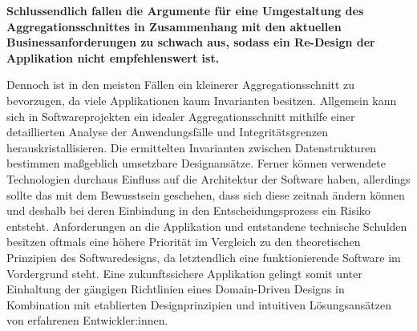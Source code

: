 \textbf{Schlussendlich fallen die Argumente für eine Umgestaltung des Aggregationsschnittes in Zusammenhang mit den aktuellen Businessanforderungen zu schwach aus, sodass ein Re-Design der Applikation nicht empfehlenswert ist.}

Dennoch ist in den meisten Fällen ein kleinerer Aggregationsschnitt zu bevorzugen, da viele Applikationen kaum Invarianten besitzen. Allgemein kann sich in Softwareprojekten ein idealer Aggregationsschnitt mithilfe einer detaillierten Analyse der Anwendungsfälle und Integritätsgrenzen herauskristallisieren. Die ermittelten Invarianten zwischen Datenstrukturen bestimmen maßgeblich umsetzbare Designansätze. Ferner können verwendete Technologien durchaus Einfluss auf die Architektur der Software haben, allerdings sollte das mit dem Bewusstsein geschehen, dass sich diese zeitnah ändern können und deshalb bei deren Einbindung in den Entscheidungsprozess ein Risiko entsteht. Anforderungen an die Applikation und entstandene \gls{technische Schulden} besitzen oftmals eine höhere Priorität im Vergleich zu den theoretischen Prinzipien des Softwaredesigns, da letztendlich eine funktionierende Software im Vordergrund steht. Eine zukunftssichere Applikation gelingt somit unter Einhaltung der gängigen Richtlinien eines Domain-Driven Designs in Kombination mit etablierten Designprinzipien und intuitiven Lösungsansätzen von erfahrenen Entwickler:innen.  